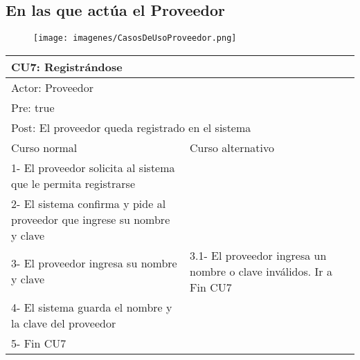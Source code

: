 \subsection{En las que actúa el Proveedor}

\begin{figure}[H]
    \texttt{[image: imagenes/CasosDeUsoProveedor.png]}
\end{figure}

\begin{table}[H]
  \begin{adjustbox}{max width = \textwidth}
  \begin{tabular}{|l|l|}
    \hline
    \multicolumn{2}{|l|}{CU7: Registrándose} \\\hline
    \multicolumn{2}{|l|}{Actor: Proveedor} \\\hline
    \multicolumn{2}{|l|}{Pre: true} \\\hline
    \multicolumn{2}{|l|}{Post: El proveedor queda registrado en el sistema} \\\hline
     Curso normal & Curso alternativo\\ \hline
     1- El proveedor solicita al sistema que le permita registrarse & \\ \hline
     2- El sistema confirma y pide al proveedor que ingrese su nombre y clave & \\ \hline
     3- El proveedor ingresa su nombre y clave & 3.1- El proveedor ingresa un nombre o clave inválidos. Ir a Fin CU7\\ \hline
     4- El sistema guarda el nombre y la clave del proveedor & \\ \hline
     5- Fin CU7 & \\ \hline
  \end{tabular}
  \end{adjustbox}
\end{table}

